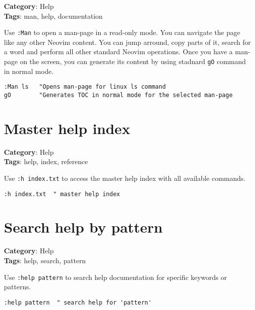 {{{{{{\textbf{Category}: Help\\ \textbf{Tags}: man, help, documentation
\vspace{0.5cm}

Use {\footnotesize \Verb§:Man§} to open a man-page in a read-only mode. You can navigate the page like any other Neovim content. You can jump arround, copy parts of it, search for a word and perform all other standard Neovim operations. Once you have a man-page on the screen, you can generate its content by using stadnard {\footnotesize \Verb§gO§} command in normal mode.

\begin{Exa*}{}
\begin{Verbatim}[fontsize=\footnotesize, breaklines, breakanywhere]
:Man ls   "Opens man-page for linux ls command
gO        "Generates TOC in normal mode for the selected man-page
\end{Verbatim}
\end{Exa*}

\section{Master help index}

\textbf{Category}: Help\\ \textbf{Tags}: help, index, reference
\vspace{0.5cm}

Use {\footnotesize \Verb§:h index.txt§} to access the master help index with all available commands.

\begin{Exa*}{}
\begin{Verbatim}[fontsize=\footnotesize, breaklines, breakanywhere]
:h index.txt  " master help index
\end{Verbatim}
\end{Exa*}

\section{Search help by pattern}

\textbf{Category}: Help\\ \textbf{Tags}: help, search, pattern
\vspace{0.5cm}

Use {\footnotesize \Verb§:help pattern§} to search help documentation for specific keywords or patterns.

\begin{Exa*}{}
\begin{Verbatim}[fontsize=\footnotesize, breaklines, breakanywhere]
:help pattern  " search help for 'pattern'
\end{Verbatim}
\end{Exa*}

}}}}}}
